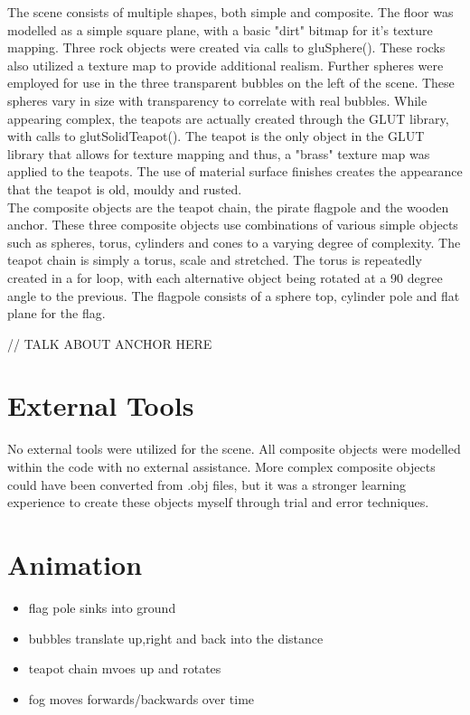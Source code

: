 \documentclass[]{article}
\begin{document}
The scene consists of multiple shapes, both simple and composite. The floor was modelled as a simple square plane, with a basic "dirt" bitmap for it's texture mapping. Three rock objects were created via calls to gluSphere(). These rocks also utilized a texture map to provide additional realism. Further spheres were employed for use in the three transparent bubbles on the left of the scene. These spheres vary in size with transparency to correlate with real bubbles. While appearing complex, the teapots are actually created through the GLUT library, with calls to glutSolidTeapot(). The teapot is the only object in the GLUT library that allows for texture mapping and thus, a "brass" texture map was applied to the teapots. The use of material surface finishes creates the appearance that the teapot is old, mouldy and rusted. \\

The composite objects are the teapot chain, the pirate flagpole and the wooden anchor. These three composite objects use combinations of various simple objects such as spheres, torus, cylinders and cones to a varying degree of complexity. The teapot chain is simply a torus, scale and stretched. The torus is repeatedly created in a for loop, with each alternative object being rotated at a 90 degree angle to the previous. The flagpole consists of a sphere top, cylinder pole and flat plane for the flag.

// TALK ABOUT ANCHOR HERE

\section*{External Tools}

No external tools were utilized for the scene. All composite objects were modelled within the code with no external assistance. More complex composite objects could have been converted from .obj files, but it was a stronger learning experience to create these objects myself through trial and error techniques.


\section*{Animation}

\begin{itemize}
	\item flag pole sinks into ground
	\item bubbles translate up,right and back into the distance
	\item teapot chain mvoes up and rotates 
	\item fog moves forwards/backwards over time
\end{itemize}


\break
\setlength{}
\printbibliography

\end{document}
